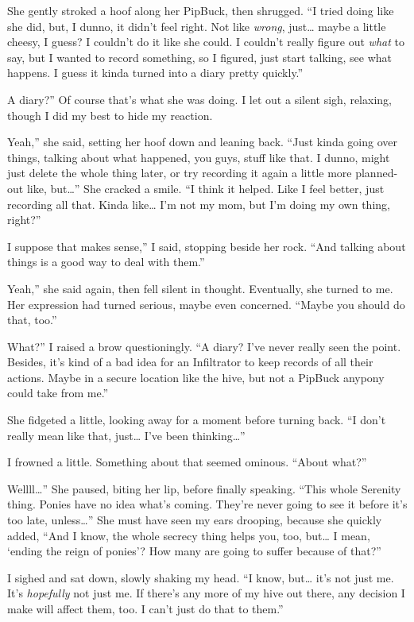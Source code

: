 She gently stroked a hoof along her PipBuck, then shrugged. “I tried doing like she did, but, I dunno, it didn’t feel right. Not like \textit{wrong}, just… maybe a little cheesy, I guess? I couldn’t do it like she could. I couldn’t really figure out \textit{what} to say, but I wanted to record something, so I figured, just start talking, see what happens. I guess it kinda turned into a diary pretty quickly.”

\leavevmode{}A diary?” Of course that’s what she was doing. I let out a silent sigh, relaxing, though I did my best to hide my reaction.

\leavevmode{}Yeah,” she said, setting her hoof down and leaning back. “Just kinda going over things, talking about what happened, you guys, stuff like that. I dunno, might just delete the whole thing later, or try recording it again a little more planned-out like, but…” She cracked a smile. “I think it helped. Like I feel better, just recording all that. Kinda like… I’m not my mom, but I’m doing my own thing, right?”

\leavevmode{}I suppose that makes sense,” I said, stopping beside her rock. “And talking about things is a good way to deal with them.”

\leavevmode{}Yeah,” she said again, then fell silent in thought. Eventually, she turned to me. Her expression had turned serious, maybe even concerned. “Maybe you should do that, too.”

\leavevmode{}What?” I raised a brow questioningly. “A diary? I’ve never really seen the point. Besides, it’s kind of a bad idea for an Infiltrator to keep records of all their actions. Maybe in a secure location like the hive, but not a PipBuck anypony could take from me.”

She fidgeted a little, looking away for a moment before turning back. “I don’t really mean like that, just… I’ve been thinking…”

I frowned a little. Something about that seemed ominous. “About what?”

\leavevmode{}Wellll…” She paused, biting her lip, before finally speaking. “This whole Serenity thing. Ponies have no idea what’s coming. They’re never going to see it before it’s too late, unless…” She must have seen my ears drooping, because she quickly added, “And I know, the whole secrecy thing helps you, too, but… I mean, ‘ending the reign of ponies’? How many are going to suffer because of that?”

I sighed and sat down, slowly shaking my head. “I know, but… it’s not just me. It’s \textit{hopefully} not just me. If there’s any more of my hive out there, any decision I make will affect them, too. I can’t just do that to them.”

